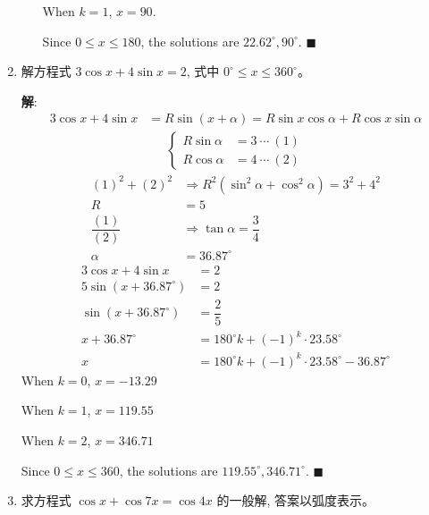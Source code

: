 \documentclass{report}
\newcommand{\sol}{\vspace{0.2cm}\textbf{解}:}
\begin{document}
\begin{enumerate}[leftmargin=*]
\begin{enumerate}
        When $k = 1$, $x = 90$.

        Since $0 \leq x \leq 180$, the solutions are $22.62^{\circ}, 90^{\circ}$. \hfill $\blacksquare$
        \end{enumerate}

        \item 解方程式 $3 \cos x+4 \sin x=2$, 式中 $0^{\circ} \leq x \leq 360^{\circ}$。
        
        \sol{}
        \begin{align*}
            3 \cos x+4 \sin x &= R\sin(x + \alpha) = R\sin x\cos\alpha + R\cos x\sin\alpha
        \end{align*}
        \begin{align*}
            \begin{cases}
                R\sin\alpha &= 3\ \cdots\ (1)\\
                R\cos\alpha &= 4\ \cdots\ (2)
            \end{cases}
        \end{align*}
        \begin{align*}
            (1)^2 + (2)^2 &\Rightarrow R^2(\sin^2\alpha + \cos^2\alpha) = 3^2 + 4^2\\
            R &= 5\\
            \dfrac{(1)}{(2)} &\Rightarrow \tan\alpha = \dfrac{3}{4}\\
            \alpha &= 36.87^{\circ}
        \end{align*}
        \begin{align*}
            3 \cos x+4 \sin x &= 2\\
            5\sin(x + 36.87^{\circ}) &= 2\\
            \sin(x + 36.87^{\circ}) &= \dfrac{2}{5}\\
            x + 36.87^{\circ} &= 180^{\circ}k + (-1)^k \cdot 23.58^{\circ}\\
            x &= 180^{\circ}k + (-1)^k \cdot 23.58^{\circ} - 36.87^{\circ}
        \end{align*}
        When $k = 0$, $x = -13.29$

        When $k = 1$, $x = 119.55$

        When $k = 2$, $x = 346.71$

        Since $0 \leq x \leq 360$, the solutions are $119.55^{\circ}, 346.71^{\circ}$. \hfill $\blacksquare$

        \item 求方程式 $\cos x+\cos 7 x=\cos 4 x$ 的一般解, 答案以弧度表示。
        

\end{enumerate}
\end{document}

